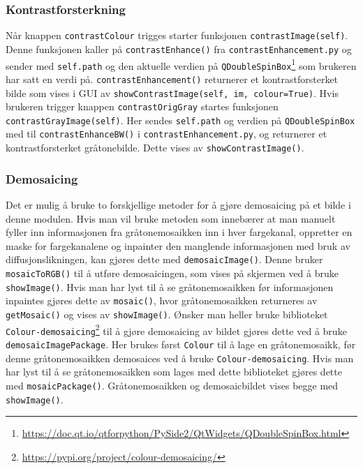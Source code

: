 \subsubsection{Kontrastforsterkning}
Når knappen \texttt{contrastColour} trigges starter funksjonen \texttt{contrastImage(self)}. Denne funksjonen kaller på \texttt{contrastEnhance()} fra \texttt{contrastEnhancement.py} og sender med \texttt{self.path} og den aktuelle verdien på \texttt{QDoubleSpinBox}\footnote{\url{https://doc.qt.io/qtforpython/PySide2/QtWidgets/QDoubleSpinBox.html}} som brukeren har satt en verdi på. \newline\texttt{contrastEnhancement()} returnerer et kontrastforsterket bilde som vises i GUI av \newline\texttt{showContrastImage(self, im, colour=True)}. Hvis brukeren trigger knappen \texttt{contrastOrigGray} startes funksjonen \texttt{contrastGrayImage(self)}. Her sendes \texttt{self.path} og verdien på \newline\texttt{QDoubleSpinBox} med til \texttt{contrastEnhanceBW()} i \texttt{contrastEnhancement.py}, og returnerer et kontrastforsterket gråtonebilde. Dette vises av \texttt{showContrastImage()}.

\subsubsection{Demosaicing}
Det er mulig å bruke to forskjellige metoder for å gjøre demosaicing på et bilde i denne modulen. Hvis man vil bruke metoden som innebærer at man manuelt fyller inn informasjonen fra gråtonemosaikken inn i hver fargekanal, oppretter en maske for fargekanalene og inpainter den manglende informasjonen med bruk av diffusjonslikningen, kan gjøres dette med \texttt{demosaicImage()}. Denne bruker \texttt{mosaicToRGB()} til å utføre demosaicingen, som vises på skjermen ved å bruke \texttt{showImage()}. Hvis man har lyst til å se gråtonemosaikken før informasjonen inpaintes gjøres dette av \texttt{mosaic()}, hvor gråtonemosaikken returneres av \texttt{getMosaic()} og vises av \texttt{showImage()}. Ønsker man heller bruke biblioteket \texttt{Colour-demosaicing}\footnote{\url{https://pypi.org/project/colour-demosaicing/}} til å gjøre demosaicing av bildet gjøres dette ved å bruke \texttt{demosaicImagePackage}. Her brukes først \texttt{Colour} til å lage en gråtonemosaikk, før denne gråtonemosaikken demosaices ved å bruke \texttt{Colour-demosaicing}. Hvis man har lyst til å se gråtonemosaikken som lages med dette biblioteket gjøres dette med \texttt{mosaicPackage()}. Gråtonemosaikken og demosaicbildet vises begge med \texttt{showImage()}.

